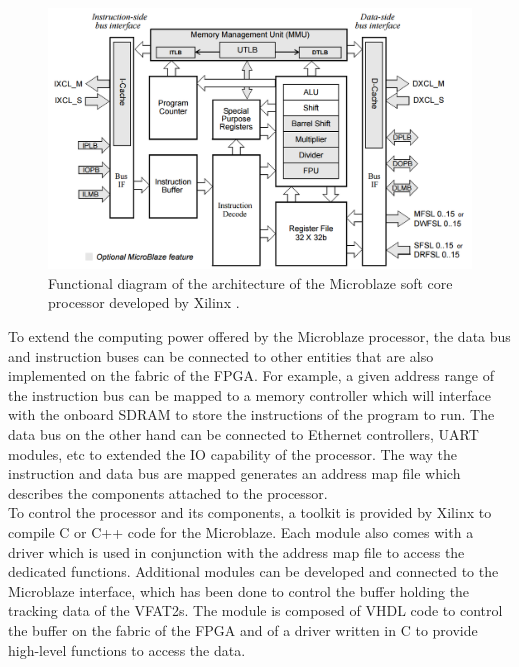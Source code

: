       \begin{figure}[h!]
        \centering
        \includegraphics[width=\textwidth]{img/III-1-arch/Microblaze.png}
        \caption{Functional diagram of the architecture of the Microblaze soft core processor developed by Xilinx \cite{Microblaze}.}
        \label{fig:III-1-Microblaze}
      \end{figure}

      To extend the computing power offered by the Microblaze processor, the data bus and instruction buses can be connected to other entities that are also implemented on the fabric of the FPGA. For example, a given address range of the instruction bus can be mapped to a memory controller which will interface with the onboard SDRAM to store the instructions of the program to run. The data bus on the other hand can be connected to Ethernet controllers, UART modules, etc to extended the IO capability of the processor. The way the instruction and data bus are mapped generates an address map file which describes the components attached to the processor. \\

      To control the processor and its components, a toolkit is provided by Xilinx to compile C or C++ code for the Microblaze. Each module also comes with a driver which is used in conjunction with the address map file to access the dedicated functions. Additional modules can be developed and connected to the Microblaze interface, which has been done to control the buffer holding the tracking data of the VFAT2s. The module is composed of VHDL code to control the buffer on the fabric of the FPGA and of a driver written in C to provide high-level functions to access the data. \\

